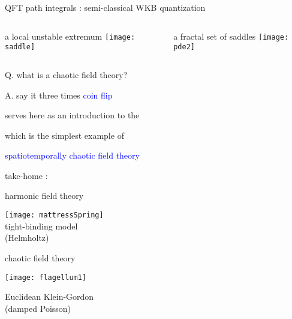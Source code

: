 \begin{frame}{QFT path integrals : semi-classical WKB quantization}
  \begin{columns}
\begin{block}{a local unstable extremum}
\texttt{[image: saddle]}%
\end{block}
\begin{block}{a fractal set of saddles}
\texttt{[image: pde2]}%
\end{block}
  \end{columns}
\end{frame}

\begin{frame}{Q. what is a chaotic field theory?}
    \begin{block}{A. say it three times}
{\textcolor{blue}{coin flip}}
\bigskip

\hfill serves here as an introduction to the

{\textcolor{blue}{\catlatt}}
\bigskip

\hfill which is the simplest example of %

 \textcolor{blue}{spatiotemporally chaotic field theory}
\bigskip\bigskip\bigskip
    \end{block}
\end{frame} %

\begin{frame}{take-home :   }
\begin{center}
            \begin{minipage}[c]{0.40\textwidth}\begin{center}
{\color{purple}harmonic} field theory
\bigskip

\texttt{[image: mattressSpring]}\\
{\color{blue}tight-binding} model \\ ({\color{blue}Helmholtz})
            \end{center}\end{minipage}
            \hspace{2ex}
            \begin{minipage}[c]{0.46\textwidth}\begin{center}
{\color{purple}chaotic} field theory\\
\bigskip
\bigskip
\bigskip

\texttt{[image: flagellum1]}\\
\bigskip

Euclidean {\color{blue}Klein-Gordon} \\ (damped {\color{blue}Poisson})
            \end{center}\end{minipage}
\end{center}
\end{frame}%

